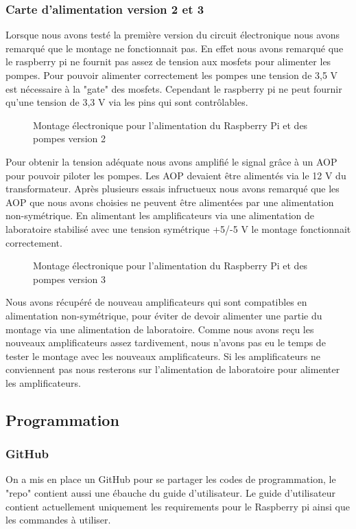 \documentclass[a4paper, 11pt]{article}
\begin{document}
\subsubsection{Carte d'alimentation version 2 et 3}
Lorsque nous avons testé la première version du circuit électronique nous avons remarqué que le montage ne fonctionnait pas.
En effet nous avons remarqué que le raspberry pi ne fournit pas assez de tension aux mosfets pour alimenter les pompes.
Pour pouvoir alimenter correctement les pompes une tension de 3,5 V est nécessaire à la "gate" des mosfets.
Cependant le raspberry pi ne peut fournir qu'une tension de 3,3 V via les pins qui sont contrôlables.
\begin{figure}[H]
    \centering
    \caption{Montage électronique pour l'alimentation du Raspberry Pi et des pompes version 2}
    \label{fig:CAO_electronique_V2}
\end{figure}
Pour obtenir la tension adéquate nous avons amplifié le signal grâce à un AOP pour pouvoir piloter les pompes.
Les AOP devaient être alimentés via le 12 V du transformateur.
Après plusieurs essais infructueux nous avons remarqué que les AOP que nous avons choisies ne peuvent être alimentées par une alimentation non-symétrique.
En alimentant les amplificateurs via une alimentation de laboratoire stabilisé avec une tension symétrique +5/-5 V le montage fonctionnait correctement.
\begin{figure}[H]
    \centering
    \caption{Montage électronique pour l'alimentation du Raspberry Pi et des pompes version 3}
    \label{fig:CAO_electronique_V3}
\end{figure}
Nous avons récupéré de nouveau amplificateurs qui sont compatibles en alimentation non-symétrique, pour éviter de devoir alimenter une partie du montage via une alimentation de laboratoire.
Comme nous avons reçu les nouveaux amplificateurs assez tardivement, nous n'avons pas eu le temps de tester le montage avec les nouveaux amplificateurs.
Si les amplificateurs ne conviennent pas nous resterons sur l'alimentation de laboratoire pour alimenter les amplificateurs.
\subsection{Programmation}
\subsubsection{GitHub}
On a mis en place un GitHub pour se partager les codes de programmation, le "repo" contient aussi une ébauche du guide d'utilisateur.
Le guide d'utilisateur contient actuellement uniquement les requirements pour le Raspberry pi ainsi que les commandes à utiliser.
\end{document}
